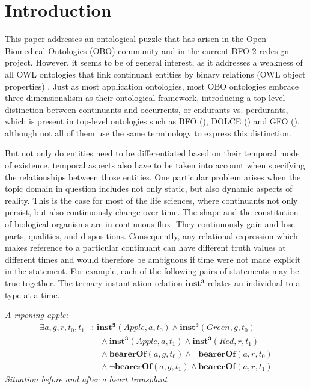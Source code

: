 \documentclass{ao2e}
\newcommand{\mirel}[1]{\ensuremath{\mathrm{\mathbf{#1}}}}
\newcommand{\mclass}[1]{\ensuremath{\mathit{#1}}}
\begin{document}
\section{Introduction}

This paper addresses an ontological puzzle that has arisen in the
Open Biomedical Ontologies (OBO) community and in the current BFO 2 redesign
project.  However, it seems to be of general interest, as it addresses a
weakness of all OWL ontologies that link continuant entities by binary relations
(OWL object properties) . Just as most application ontologies, most OBO
ontologies embrace
three-dimensionalism as their ontological framework, introducing a top level
distinction between continuants and occurrents, or endurants vs. perdurants,
which is present in top-level ontologies such as BFO (\cite{BFO1:ref}), DOLCE
(\cite{DOLCE:ref}) and GFO (\cite{GFO:ref}),
although not all of them use the same terminology to express this
distinction.

But not only do entities need to be differentiated based on their temporal mode
of existence, temporal aspects also have to be taken into account when
specifying the relationships between those entities. One particular problem
arises when the topic domain in question includes not only static, but also
dynamic aspects of reality. This is the case for most of the life sciences,
where continuants not only persist, but also continuously change over time. The
shape and the constitution of biological organisms are in continuous flux. They
continuously gain and lose parts, qualities, and dispositions. Consequently, any
relational expression which makes reference to a particular continuant can have
different truth values at different times and would therefore be ambiguous if
time were not made explicit in the statement. For example, each of the following
pairs of statements may be true together. The ternary instantiation relation
\mirel{inst^3} relates an individual to a type at a time. 

\pagebreak
\vspace{1\baselineskip}
\noindent\emph{A ripening apple:}
\nopagebreak
\begin{equation}
\begin{split}
\exists a, g, r, t_0,t_1&:\, \mirel{inst^3}(\mclass{Apple}, a, t_0) \wedge
\mirel{inst^3}(\mclass{Green},g,t_0) \\
&\quad \wedge
\mirel{inst^3}(\mclass{Apple},a,t_1) \wedge
\mirel{inst^3}(\mclass{Red},r,t_1) \\
&\quad\wedge
\mirel{bearerOf}(a,g,t_0) \wedge \neg\mirel{bearerOf}(a,r,t_0) \\
&\quad\wedge \neg\mirel{bearerOf}(a,g,t_1) \wedge \mirel{bearerOf}(a,r,t_1)
\end{split}
\end{equation}
\noindent\emph{Situation before and after a heart transplant}
\end{document}
